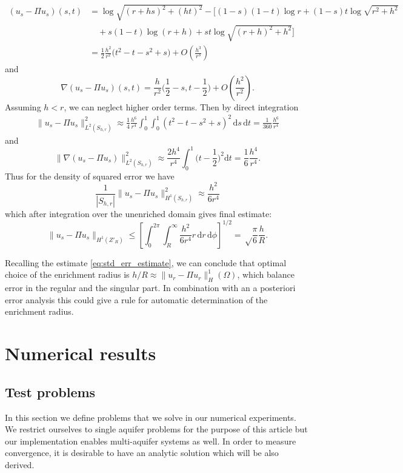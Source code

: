 \documentclass{elsarticle}
\def\abs#1{\left|#1\right|}
\def\d{\mathrm{d}}
\def\norm#1{\| #1 \|}
\def\abs#1{| #1 |}
\begin{document}
\begin{align*}
 (u_s - \Pi u_s)(s,t)&=\log\sqrt{(r+hs)^2+(ht)^2} -\Big[(1-s)(1-t)\log r + (1-s)t\log\sqrt{r^2+h^2}\\
 &\quad+ s(1-t) \log(r+h) + st\log\sqrt{(r+h)^2+h^2} \Big]\\
 &=\frac12 \frac{h^2}{r^2}\big(t^2-t - s^2 +s\big) + O(\frac{h^3}{r^3})
\end{align*}
and 
\begin{equation}
 \nabla(u_s - \Pi u_s)(s,t) = \frac{h}{r^2} \Big( \frac12-s, t-\frac12 \Big) + O(\frac{h^2}{r^2}).
\end{equation}
Assuming $h<r$, we can neglect higher order terms. Then by direct integration
\begin{align*}
 \norm{u_s - \Pi u_s}^2_{L^2(S_{h,r})} \approx \frac14 \frac{h^6}{r^4}\int_0^1\int_0^1 (t^2-t-s^2+s)^2\,\d s\, \d t = \frac{1}{360}\frac{h^6}{r^4} 
\end{align*}
and
\begin{equation}
    \label{eq:grad_estimate_on_square}
    \norm{\nabla(u_s - \Pi u_s)}^2_{L^2(S_{h,r})} \approx \frac{2h^4}{r^4} \int_0^1 \Big(t-\frac12\Big)^2 \d t = \frac{1}{6}\frac{h^4}{r^4}.
\end{equation}
Thus for the density of squared error we have
\[
    \frac{1}{\abs{S_{h,r}}} \norm{u_s - \Pi u_s}^2_{H^1(S_{h,r})} \approx \frac{h^2}{6r^4}
\]
which after integration over the unenriched domain gives final estimate:
\begin{equation}
    \label{eq:singular_approx_error}
    \norm{u_s - \Pi u_s}_{H^1(Z'_R)} \le \left[\int_0^{2\pi} \int_R^\infty \frac{h^2} {6r^4} r \,\d r\, \d \phi\right]^{1/2} = \sqrt\frac{\pi}{6}\frac{h}{R}. 
\end{equation}

Recalling the estimate \eqref{eq:std_err_estimate}, we can conclude that optimal choice of the enrichment radius is $h/R\approx \norm{u_r-\Pi u_r}_H^1(\Omega)$, 
which balance error in the regular and the singular part. In combination with an a posteriori error analysis this could give a rule for automatic
determination of the enrichment radius.



\section{Numerical results}
\label{sec:results}

\subsection{Test problems} \label{sec:test_cases}
In this section we define problems that we solve in our numerical experiments. We restrict ourselves to 
single aquifer problems for the purpose of this article but our implementation enables multi-aquifer systems 
as well. In order to measure convergence, it is desirable to have an analytic solution which will be also derived. 
\end{document}
